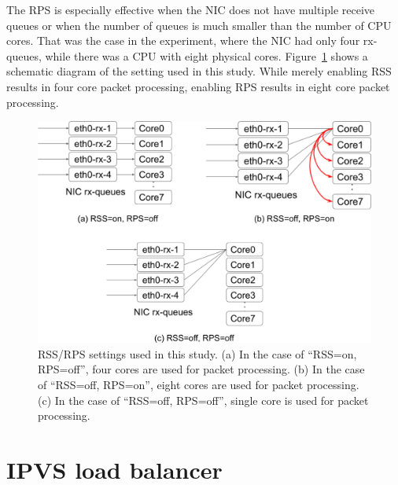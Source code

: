 The RPS is especially effective when the NIC does not have multiple receive queues or when the number of queues is 
much smaller than the number of CPU cores. 
That was the case in the experiment, where the NIC had only four rx-queues, 
while there was a CPU with eight physical cores.
Figure~\ref{Figs/rss-rps-none} shows a schematic diagram of the setting used in this study.
While merely enabling RSS results in four core packet processing, enabling RPS results in eight core packet processing.

\begin{figure}[h]
  \centering
  \includegraphics[width=0.8\columnwidth]{Figs/rss-rps-none}

  \par\bigskip
  \centering
  \begin{minipage}{0.9\columnwidth}
    \caption[RSS/RPS settings]{
      RSS/RPS settings used in this study.
      (a) In the case of \enquote{RSS=on, RPS=off}, four cores are used for packet processing.
      (b) In the case of \enquote{RSS=off, RPS=on}, eight cores are used for packet processing.
      (c) In the case of \enquote{RSS=off, RPS=off}, single core is used for packet processing.
    }
    \label{Figs/rss-rps-none}
  \end{minipage}
\end{figure}

\FloatBarrier

\section{IPVS load balancer}

